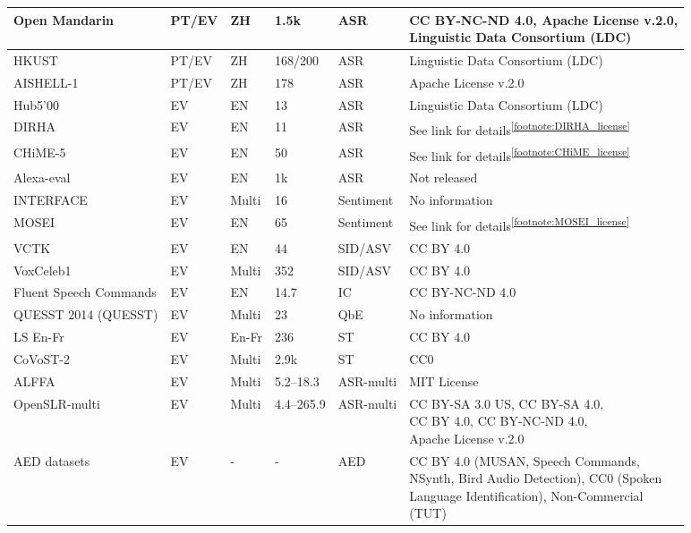 \begin{table*}[t]
{{\begin{tabular}{llllll}
    Open Mandarin & PT/EV & ZH & 1.5k & ASR & \makecell[l]{CC BY-NC-ND 4.0, Apache License v.2.0,\\ Linguistic Data Consortium (LDC)} \\ \hline %
    HKUST & PT/EV & ZH & 168/200 & ASR & Linguistic Data Consortium (LDC) \\ \hline %
    AISHELL-1 & PT/EV & ZH & 178 & ASR & Apache License v.2.0 \\ \hline %
    Hub5'00 & EV & EN & 13 & ASR & Linguistic Data Consortium (LDC) \\ \hline %
    DIRHA & EV & EN & 11 & ASR & See link for details\textsuperscript{\ref{footnote:DIRHA_license}} \\ \hline %
    CHiME-5 & EV & EN & 50 & ASR & See link for details\textsuperscript{\ref{footnote:CHiME_license}}\\ \hline %
    Alexa-eval & EV & EN & 1k & ASR & Not released \\ \hline %
    INTERFACE & EV & Multi & 16 & Sentiment & No information \\ \hline %
    MOSEI & EV & EN & 65 & Sentiment & See link for details\textsuperscript{\ref{footnote:MOSEI_license}}\\ \hline %
    VCTK & EV & EN & 44 & SID/ASV & CC BY 4.0 \\ \hline %
    VoxCeleb1 & EV & Multi & 352 & SID/ASV & CC BY 4.0 \\ \hline
    Fluent Speech Commands & EV & EN & 14.7 & IC & CC BY-NC-ND 4.0 \\ \hline
    QUESST 2014 (QUESST) & EV & Multi & 23 & QbE & No information \\ \hline
    LS En-Fr & EV & En-Fr & 236 & ST & CC BY 4.0 \\ \hline %
    CoVoST-2 & EV & Multi & 2.9k & ST & CC0 \\ \hline

    ALFFA & EV & Multi & 5.2--18.3 & ASR-multi & MIT License \\ \hline %
    OpenSLR-multi & EV & Multi & 4.4--265.9 & ASR-multi & \makecell[l]{CC BY-SA 3.0 US, CC BY-SA 4.0, \\CC BY 4.0, CC BY-NC-ND 4.0, \\ Apache License v.2.0}\\ \hline %
    AED datasets & EV & - & - & AED & \makecell[l]{CC BY 4.0 (MUSAN, Speech Commands, \\ NSynth, Bird Audio Detection), CC0 (Spoken \\ Language Identification), Non-Commercial \\ (TUT)} \\
    \bottomrule
  \end{tabular}}}
\end{table*}

